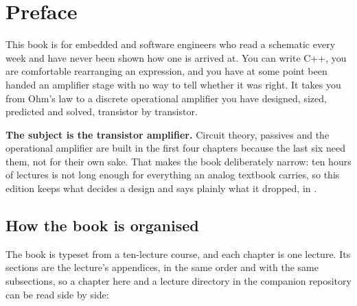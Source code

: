 
\chapter{Preface}

This book is for embedded and software engineers who read a schematic every week and have never
been shown how one is arrived at. You can write C++, you are comfortable rearranging an
expression, and you have at some point been handed an amplifier stage with no way to tell whether
it was right. It takes you from Ohm's law to a discrete operational amplifier you have designed,
sized, predicted and solved, transistor by transistor.

\textbf{The subject is the transistor amplifier.} Circuit theory, passives and the operational
amplifier are built in the first four chapters because the last six need them, not for their own
sake. That makes the book deliberately narrow: ten hours of lectures is not long enough for
everything an analog textbook carries, so this edition keeps what decides a design and says
plainly what it dropped, in .

\section*{How the book is organised}
The book is typeset from a ten-lecture course, and each chapter is one lecture. Its sections are
the lecture's appendices, in the same order and with the same subsections, so a chapter here and a
lecture directory in the companion repository can be read side by side:

